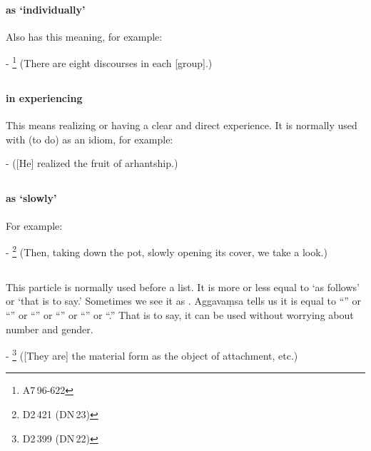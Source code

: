 \paragraph*{ as `individually'} Also  has this meaning, for example:\par
- \footnote{A7\,96-622} (There are eight discourses in each [group].) \par

\subsection*{}\label{nip:sacchi}
\paragraph*{ in experiencing} This means realizing or having a clear and direct experience. It is normally used with  (to do) as an idiom, for example:\par
-  ([He] realized the fruit of arhant\-ship.) \par

\subsection*{}\label{nip:sadnikadm}
\paragraph*{ as `slowly'} For example:\par
- \footnote{D2\,421 (DN\,23)} (Then, taking down the pot, slowly opening its cover, we take a look.) \par

\subsection*{}\label{nip:seyyathidadm}
This particle is normally used before a list. It is more or less equal to `as follows' or `that is to say.' Sometimes we see it as . Aggava\d msa tells us it is equal to ``'' or ``'' or ``'' or ``'' or ``'' or ``.'' That is to say, it can be used without worrying about number and gender.\par
- \footnote{D2\,399 (DN\,22)} ([They are] the material form as the object of attachment, etc.) \par

